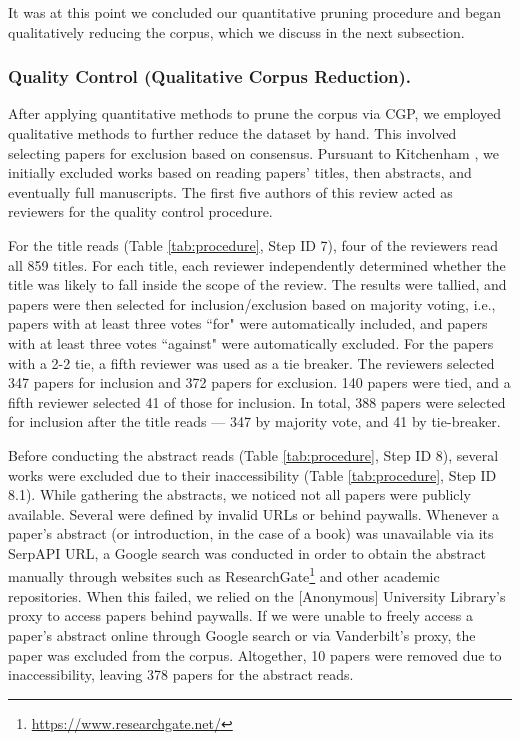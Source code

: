 \documentclass[manuscript,screen,review]{acmart}
\begin{document}
It was at this point we concluded our quantitative pruning procedure and began qualitatively reducing the corpus, which we discuss in the next subsection.

\subsubsection{Quality Control (Qualitative Corpus Reduction).} \label{subsubsec:quality_control}

After applying quantitative methods to prune the corpus via CGP, we employed qualitative methods to further reduce the dataset by hand. This involved selecting papers for exclusion based on consensus. Pursuant to Kitchenham \cite{kitchenham2004procedures}, we initially excluded works based on reading papers' titles, then abstracts, and eventually full manuscripts. The first five authors of this review acted as reviewers for the quality control procedure. 

For the title reads (Table \ref{tab:procedure}, Step ID 7), four of the reviewers read all 859 titles. For each title, each reviewer independently determined whether the title was likely to fall inside the scope of the review. The results were tallied, and papers were then selected for inclusion/exclusion based on majority voting, i.e., papers with at least three votes ``for" were automatically included, and papers with at least three votes ``against" were automatically excluded. For the papers with a 2-2 tie, a fifth reviewer was used as a tie breaker. The reviewers selected 347 papers for inclusion and 372 papers for exclusion. 140 papers were tied, and a fifth reviewer selected 41 of those for inclusion. In total, 388 papers were selected for inclusion after the title reads --- 347 by majority vote, and 41 by tie-breaker.

Before conducting the abstract reads (Table \ref{tab:procedure}, Step ID 8), several works were excluded due to their inaccessibility (Table \ref{tab:procedure}, Step ID 8.1). While gathering the abstracts, we noticed not all papers were publicly available. Several were defined by invalid URLs or behind paywalls. Whenever a paper's abstract (or introduction, in the case of a book) was unavailable via its SerpAPI URL, a Google search was conducted in order to obtain the abstract manually through websites such as ResearchGate\footnote{\href{https://www.researchgate.net/}{https://www.researchgate.net/}} and other academic repositories. When this failed, we relied on the [Anonymous] University Library's proxy to access papers behind paywalls. If we were unable to freely access a paper's abstract online through Google search or via Vanderbilt's proxy, the paper was excluded from the corpus. Altogether, 10 papers were removed due to inaccessibility, leaving 378 papers for the abstract reads.
\end{document}
